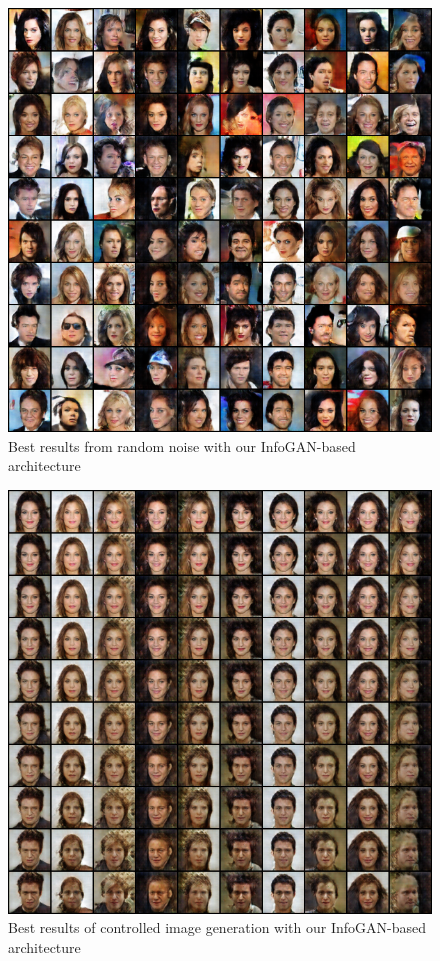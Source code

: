 \documentclass{egpubl}
\begin{document}
\begin{figure}[!htb]
	\centering
	\includegraphics[width=1\linewidth]{pic/best1}
	\caption{Best results from random noise with our InfoGAN-based architecture}
	\label{fig:best1}
\end{figure}

\begin{figure}[!htb]
	\centering
	\includegraphics[width=1\linewidth]{pic/best2}
	\caption{Best results of controlled image generation with our InfoGAN-based architecture}
	\label{fig:best2}
\end{figure}
\end{document}
